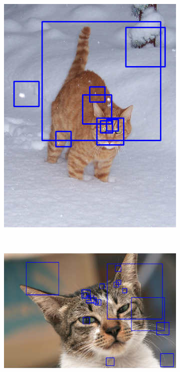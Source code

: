 \documentclass[hyperref]{acmtrans2e}
\begin{document}
\begin{figure}
\centering
\begin{subfigure}{.3\textwidth}
  \centering
  \includegraphics[width=\linewidth]{cascadexml1}
\end{subfigure}%
~~
\begin{subfigure}{.3\textwidth}
  \centering
  \includegraphics[width=\linewidth]{cascadexml2}

\end{subfigure}
\end{figure}
\end{document}
